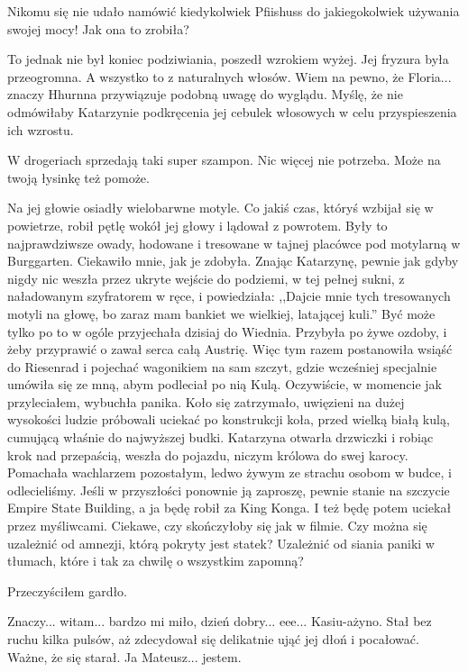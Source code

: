 Nikomu się nie udało namówić kiedykolwiek Pfiishuss do jakiegokolwiek używania swojej mocy! Jak ona to zrobiła?

To jednak nie był koniec podziwiania, poszedł wzrokiem wyżej.
Jej fryzura była przeogromna. A wszystko to z naturalnych włosów. 
Wiem na pewno, że Floria... znaczy Hhurnna przywiązuje podobną uwagę do wyglądu. 
Myślę, że nie odmówiłaby Katarzynie podkręcenia jej cebulek włosowych w celu przyspieszenia ich wzrostu.
\begin{dialogue}
\ds{} W drogeriach sprzedają taki super szampon. Nic więcej nie potrzeba. Może na twoją łysinkę też pomoże. 
\end{dialogue}

Na jej głowie osiadły wielobarwne motyle. 
Co jakiś czas, któryś wzbijał się w powietrze, robił pętlę wokół jej głowy i lądował z powrotem.
Były to najprawdziwsze owady, hodowane i tresowane w tajnej placówce pod motylarną w Burggarten.
Ciekawiło mnie, jak je zdobyła. Znając Katarzynę, pewnie jak gdyby nigdy nic weszła przez ukryte wejście do podziemi, w tej pełnej sukni, z naładowanym szyfratorem w ręce, i powiedziała:
,,Dajcie mnie tych tresowanych motyli na głowę, bo zaraz mam bankiet we wielkiej, latającej kuli.''
Być może tylko po to w ogóle przyjechała dzisiaj do Wiednia.
Przybyła po żywe ozdoby, i żeby przyprawić o zawał serca całą Austrię.
Więc tym razem postanowiła wsiąść do Riesenrad i pojechać wagonikiem na sam szczyt, gdzie wcześniej specjalnie umówiła się ze mną, abym podleciał po nią Kulą.
Oczywiście, w momencie jak przyleciałem, wybuchła panika. 
Koło się zatrzymało, uwięzieni na dużej wysokości ludzie próbowali uciekać po konstrukcji koła, przed wielką białą kulą, cumującą właśnie do najwyższej budki. 
Katarzyna otwarła drzwiczki i robiąc krok nad przepaścią, weszła do pojazdu, niczym królowa do swej karocy.
Pomachała wachlarzem pozostałym, ledwo żywym ze strachu osobom w budce, i odlecieliśmy.
Jeśli w przyszłości ponownie ją zaproszę, pewnie stanie na szczycie Empire State Building, a ja będę robił za King Konga.
I też będę potem uciekał przez myśliwcami. Ciekawe, czy skończyłoby się jak w filmie.
Czy można się uzależnić od amnezji, którą pokryty jest statek?
Uzależnić od siania paniki w tłumach, które i tak za chwilę o wszystkim zapomną?

Przeczyściłem gardło.
\begin{dialogue}
\ds{} Znaczy... witam... bardzo mi miło, dzień dobry... eee... Kasiu-ażyno. \dm{} Stał bez ruchu kilka pulsów, aż zdecydował się delikatnie ująć jej dłoń i pocałować.
Ważne, że się starał. \dm{} Ja Mateusz... jestem.
\end{dialogue}

